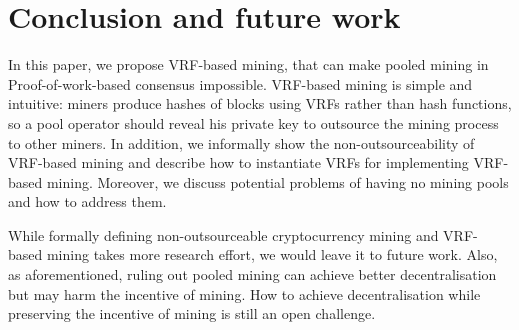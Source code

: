 \section{Conclusion and future work}



In this paper, we propose VRF-based mining, that can make pooled mining in Proof-of-work-based consensus impossible.
VRF-based mining is simple and intuitive: miners produce hashes of blocks using VRFs rather than hash functions, so a pool operator should reveal his private key to outsource the mining process to other miners.
In addition, we informally show the non-outsourceability of VRF-based mining and describe how to instantiate VRFs for implementing VRF-based mining.
Moreover, we discuss potential problems of having no mining pools and how to address them.

While formally defining non-outsourceable cryptocurrency mining and VRF-based mining takes more research effort, we would leave it to future work.
Also, as aforementioned, ruling out pooled mining can achieve better decentralisation but may harm the incentive of mining.
How to achieve decentralisation while preserving the incentive of mining is still an open challenge.